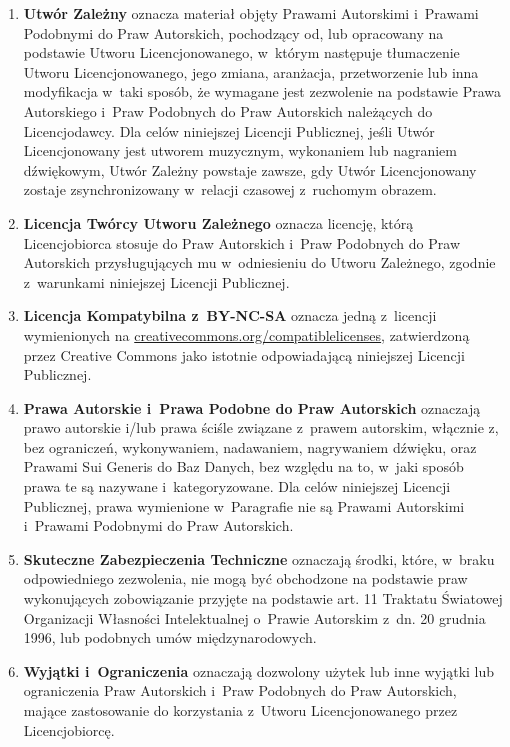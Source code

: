 \documentclass[oneside,polish,11pt,rmheadings]{mwbk}
\begin{document}
\begin{enumerate}
\item  \textbf{{\textmd{Utwór Zależny}}}{ oznacza materiał objęty Prawami Autorskimi i~Prawami Podobnymi do Praw Autorskich, pochodzący od, lub opracowany na podstawie Utworu Licencjonowanego, w~którym następuje tłumaczenie Utworu Licencjonowanego, jego zmiana, aranżacja, przetworzenie lub inna modyfikacja w~taki sposób, że wymagane jest zezwolenie na podstawie Prawa Autorskiego i~Praw Podobnych do Praw Autorskich należących do Licencjodawcy. Dla celów niniejszej Licencji Publicznej, jeśli Utwór Licencjonowany jest utworem muzycznym, wykonaniem lub nagraniem dźwiękowym, Utwór Zależny powstaje zawsze, gdy Utwór Licencjonowany zostaje zsynchronizowany w~relacji czasowej z~ruchomym obrazem. } 
\item  \textbf{{\textmd{Licencja Twórcy Utworu Zależnego}}}{ oznacza licencję, którą Licencjobiorca stosuje do Praw Autorskich i~Praw Podobnych do Praw Autorskich przysługujących mu w~odniesieniu do Utworu Zależnego, zgodnie z~warunkami niniejszej Licencji Publicznej. } 
\item  \textbf{{\textmd{Licencja Kompatybilna z~BY-NC-SA}}}{ oznacza jedną z~licencji wymienionych na }\href{https://creativecommons.org/compatiblelicenses}{creativecommons.org/compatiblelicenses}{, zatwierdzoną przez Creative Commons jako istotnie odpowiadającą niniejszej Licencji Publicznej. } 
\item  \textbf{{\textmd{Prawa Autorskie i~Prawa Podobne do Praw Autorskich}}}{ oznaczają prawo autorskie i/lub prawa ściśle związane z~prawem autorskim, włącznie z, bez ograniczeń, wykonywaniem, nadawaniem, nagrywaniem dźwięku, oraz Prawami Sui Generis do Baz Danych, bez względu na to, w~jaki sposób prawa te są nazywane i~kategoryzowane. Dla }{celów niniejszej Licencji Publicznej, prawa wymienione w~Paragrafie nie są Prawami Autorskimi i~Prawami Podobnymi do Praw Autorskich. } 
\item  \textbf{{\textmd{Skuteczne Zabezpieczenia Techniczne}}}{ oznaczają środki, które, w~braku odpowiedniego zezwolenia, nie mogą być obchodzone na podstawie praw wykonujących zobowiązanie przyjęte na podstawie art. 11 Traktatu Światowej Organizacji Własności Intelektualnej o~Prawie Autorskim z~dn. 20 grudnia 1996, lub podobnych umów międzynarodowych. } 
\item  \textbf{{\textmd{Wyjątki i~Ograniczenia}}}{ oznaczają dozwolony użytek lub inne wyjątki lub ograniczenia Praw Autorskich i~Praw Podobnych do Praw Autorskich, mające zastosowanie do korzystania z~Utworu Licencjonowanego przez Licencjobiorcę. } 

\end{enumerate}
\end{document}

